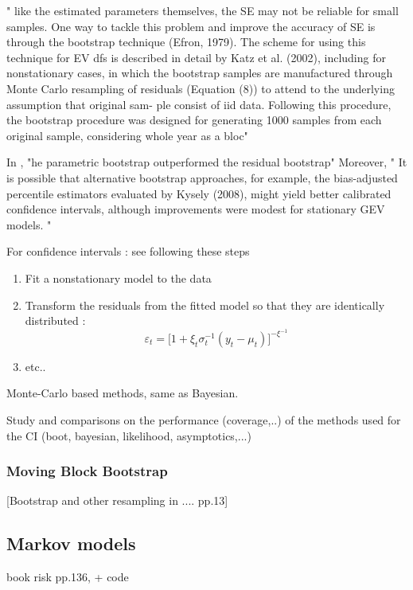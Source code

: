 " like
the estimated parameters themselves, the SE may not be
reliable for small samples. One way to tackle this problem and improve the accuracy of SE is through the bootstrap technique (Efron, 1979). The scheme for using this technique for EV dfs is described in detail by Katz et al. (2002), including for nonstationary cases,
in which the bootstrap samples are manufactured through
Monte  Carlo  resampling  of  residuals  (Equation (8))  to attend  to  the  underlying  assumption  that  original  sam-
ple  consist  of  iid  data.  Following  this procedure,  the bootstrap  procedure  was  designed  for  generating  1000
samples  from  each  original  sample,  considering  whole year  as  a  bloc"


In \citet{cannon_flexible_2010}, "he parametric bootstrap outperformed the residual bootstrap"
Moreover, " It is possible that alternative bootstrap approaches, for example, the bias-adjusted percentile estimators evaluated by Kysely
(2008), might yield better calibrated confidence intervals, although improvements were modest for stationary GEV models. "


For confidence intervals : see \citet[pp.681]{cannon_flexible_2010} 
following these steps

\begin{enumerate}
	\item Fit a nonstationary model to the data
	\item Transform the residuals from the fitted model so that they are identically distributed :
	\begin{equation}
	\varepsilon_t=\bigg[1+\xi_t\sigma^{-1}_t(y_t-\mu_t)\bigg]^{-\xi^{-1}}
	\end{equation}
	\item etc..
\end{enumerate}

Monte-Carlo based methods, same as Bayesian.

Study and comparisons on the performance (coverage,..) of the methods used for the CI (boot, bayesian, likelihood, asymptotics,...)

\subsubsection*{Moving Block Bootstrap}

[Bootstrap and other resampling in .... pp.13]


\subsection{Markov models}
book risk pp.136, \cite{shaby_markov-switching_2016} + code

